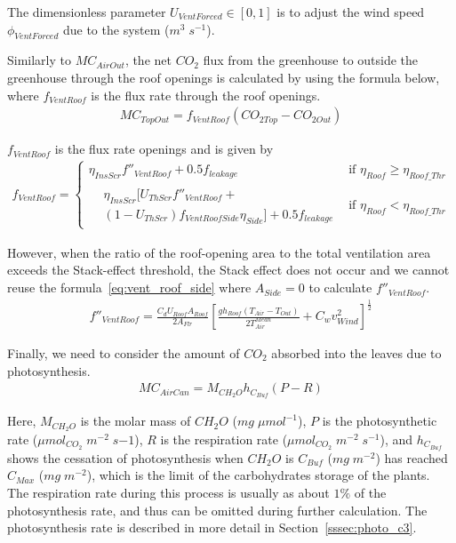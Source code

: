 \documentclass[a4paper]{article}
\begin{document}
The dimensionless parameter \(U_{VentForced} \in [0,1]\) is to adjust the wind speed \(\phi_{VentForced}\) due to
the system (\(m^3\;s^{-1}\)).

Similarly to \(MC_{AirOut}\), the net \(CO_2\) flux from the greenhouse to outside the greenhouse through the roof openings is calculated by using the formula below, where \(f_{VentRoof}\) is the flux rate through the roof openings.
\begin{align}
  MC_{TopOut} = f_{VentRoof}(CO_{2 Top} - CO_{2 Out})
\end{align}

\(f_{VentRoof}\) is the flux rate openings and is given by
\begin{gather}
  f_{VentRoof} =
  \begin{cases}
    \eta_{InsScr} f''_{VentRoof} + 0.5f_{leakage} & \text{if~} \eta_{Roof} \geq \eta_{Roof\_Thr} \\
    \begin{split}
      & \eta_{InsScr} [U_{ThScr}f''_{VentRoof} + \\
      & (1-U_{ThScr})f_{VentRoofSide} \eta_{Side}] + 0.5 f_{leakage}
    \end{split}                    & \text{if~}  \eta_{Roof} < \eta_{Roof\_Thr}
  \end{cases}
\end{gather}

However, when the ratio of the roof-opening area to the total ventilation area exceeds the Stack-effect threshold, the Stack effect does not occur and we cannot reuse the formula~\eqref{eq:vent_roof_side} where \(A_{Side} = 0\) to
calculate \(f''_{VentRoof}\).
\begin{align}
  f''_{VentRoof} = \frac{C_d U_{Roof} A_{Roof}}{2A_{Flr}} {\left[\frac{gh_{Roof}(T_{Air} - T_{Out})}{2T^{Mean}_{Air}} + C_w v^2_{Wind}\right]}^{ \frac{1}{2}}
\end{align}

Finally, we need to consider the amount of \(CO_2\) absorbed into the leaves due to photosynthesis.
\begin{align}
  MC_{AirCan} = M_{CH_2O} h_{C_{Buf}} (P - R)
\end{align}

Here, \(M_{CH_2O}\) is the molar mass of \(CH_2O\) (\(mg\;\mu mol^{-1}\)), \(P\) is the photosynthetic rate (\(\mu mol_{CO_2}\;m^{-2}\;s{-1}\)), \(R\) is the respiration rate (\(\mu mol_{CO_2}\;m^{-2}\;s^{-1}\)), and \(h_{C_{Buf}}\) shows the cessation of photosynthesis when \(CH_2O\) is \(C_{Buf}\) (\(mg\;m^{-2}\)) has reached \(C_{Max}\) (\(mg\;m^{-2}\)), which is the limit of the carbohydrates storage of the plants. The respiration rate during this process is usually as about \(1\%\) of the photosynthesis rate, and thus can be omitted during further calculation. The photosynthesis rate is described in more detail in Section~\ref{sssec:photo_c3}.
\end{document}
